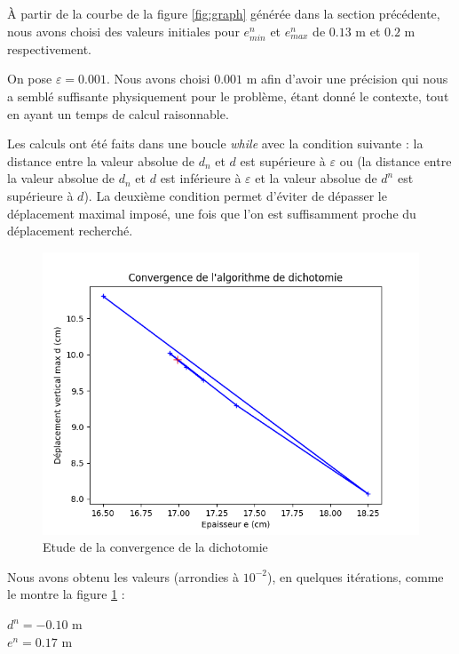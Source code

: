 \documentclass{article}
\begin{document}
    À partir de la courbe de la figure \ref{fig:graph} générée dans la section précédente, 
    nous avons choisi des valeurs initiales pour $e^n_{min}$ et $e^n_{max}$ de $0.13$ m et $0.2$ m respectivement.

    On pose $\varepsilon = 0.001$.
    Nous avons choisi $0.001$ m afin d'avoir une précision qui nous a semblé suffisante physiquement pour le problème, étant donné le contexte, tout en 
    ayant un temps de calcul raisonnable.

    Les calculs ont été faits dans une boucle \emph{while} avec la condition suivante :
    la distance entre la valeur absolue de $d_n$ et $d$ est supérieure à $\varepsilon$ ou (la distance entre la valeur absolue de $d_n$ et $d$ est inférieure à $\varepsilon$ 
    et la valeur absolue de $d^n$ est supérieure à $d$). La deuxième condition permet d'éviter de dépasser le déplacement maximal imposé, une fois que l'on est 
    suffisamment proche du déplacement recherché.   

    \begin{figure}[H]        
        \begin{center}
        
            \includegraphics[width=12cm]{imgs/dicho.png}
            \caption{Etude de la convergence de la dichotomie}
            \label{fig:dicho}
        
        \end{center}
    \end{figure}

    Nous avons obtenu les valeurs (arrondies à $10^{-2}$), en quelques itérations, comme le montre la figure \ref{fig:dicho} :
    \begin{center}
    $d^n = - 0.10$ m    \\
    $e^n = 0.17$ m
    \end{center}
\end{document}

